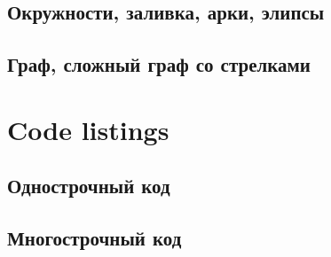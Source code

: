\documentclass[a4paper,14pt]{book}
\begin{document}




\subsection{Окружности, заливка, арки, элипсы}



\subsection{Граф, сложный граф со стрелками}



\section{Code listings}
\subsection{Однострочный код}



\subsection{Многострочный код}



\setcounter{tocdepth}{3}

\tableofcontents
\end{document}

